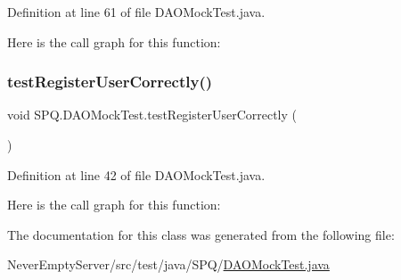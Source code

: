 Definition at line 61 of file D\+A\+O\+Mock\+Test.\+java.

Here is the call graph for this function\+:
\mbox{\label{class_s_p_q_1_1_d_a_o_mock_test_a52505d1cfefe105f8098147df9d2fce0}} 
\subsubsection{\texorpdfstring{test\+Register\+User\+Correctly()}{testRegisterUserCorrectly()}}
{\footnotesize\ttfamily void S\+P\+Q.\+D\+A\+O\+Mock\+Test.\+test\+Register\+User\+Correctly (\begin{DoxyParamCaption}{ }\end{DoxyParamCaption})}



Definition at line 42 of file D\+A\+O\+Mock\+Test.\+java.

Here is the call graph for this function\+:


The documentation for this class was generated from the following file\+:\begin{DoxyCompactItemize}
\item 
Never\+Empty\+Server/src/test/java/\+S\+P\+Q/\mbox{\hyperlink{_d_a_o_mock_test_8java}{D\+A\+O\+Mock\+Test.\+java}}\end{DoxyCompactItemize}
